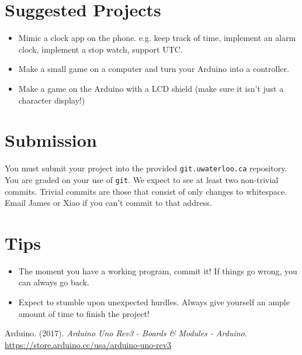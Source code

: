 \documentclass{article}
\begin{document}
\section*{Suggested Projects}
\begin{itemize}
    \item Mimic a clock app on the phone. e.g. keep track of time, implement an alarm clock, implement a stop watch, support UTC.
    \item Make a small game on a computer and turn your Arduino into a controller.
    \item Make a game on the Arduino with a LCD shield (make sure it isn't just a character display!)
\end{itemize}

\section*{Submission}
You must submit your project into the provided \texttt{git.uwaterloo.ca} repository.  You are graded on your use of \texttt{git}.  We expect to see at least two non-trivial commits.  Trivial commits are those that consist of only changes to whitespace.  Email James or Xiao if you can't commit to that address.

\section*{Tips}
\begin{itemize}
    \item The moment you have a working program, commit it!  If things go wrong, you can always go back.
    \item Expect to stumble upon unexpected hurdles.  Always give yourself an ample amount of time to finish the project!
\end{itemize}

\begin{flushleft}
\begin{thebibliography}{1}
    Arduino.
    (2017).
    \emph{Arduino Uno Rev3 - Boards \& Modules - Arduino}.
    \url{https://store.arduino.cc/usa/arduino-uno-rev3}
\end{thebibliography}
\end{flushleft}
\end{document}
